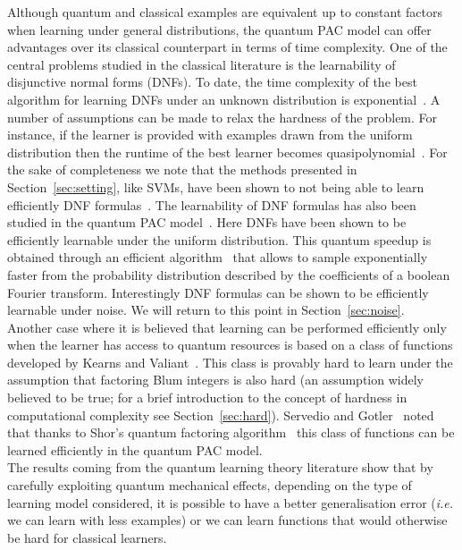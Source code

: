 \documentclass[a4paper, 11pt]{article}
\begin{document}
Although quantum and classical examples are equivalent up to constant factors when learning under general distributions, the quantum PAC model can offer advantages over its classical counterpart in terms of time complexity. One of the central problems studied in the classical literature is the learnability of disjunctive normal forms (DNFs). To date, the time complexity of the best algorithm for learning DNFs under an unknown distribution is exponential~\cite{klivans2001learning}. A number of assumptions can be made to relax the hardness of the problem. For instance, if the learner is provided with examples drawn from the uniform distribution then the runtime of the best learner becomes quasipolynomial~\cite{verbeurgt1990learning}. For the sake of completeness we note that the methods presented in Section~\ref{sec:setting}, like SVMs, have been shown to not being able to learn efficiently DNF formulas~\cite{ben2002limitations, khardon2005maximum}. The learnability of DNF formulas has also been studied in the quantum PAC model~\cite{bshouty1998learning}. Here DNFs have been shown to be efficiently learnable under the uniform distribution. This quantum speedup is obtained through an efficient algorithm~\cite{bernstein1997quantum} that allows to sample exponentially faster from the probability distribution described by the coefficients of a boolean Fourier transform. Interestingly DNF formulas can be shown to be efficiently learnable under noise. We will return to this point in Section~\ref{sec:noise}.\\

Another case where it is believed that learning can be performed efficiently only when the learner has access to quantum resources is based on a class of functions developed by Kearns and Valiant~\cite{kearns1994cryptographic}. This class is provably hard to learn under the assumption that factoring Blum integers is also hard (an assumption widely believed to be true; for a brief introduction to the concept of hardness in computational complexity see Section~\ref{sec:hard}). Servedio and Gotler~\cite{servedio2004equivalences}  noted that thanks to Shor's  quantum factoring algorithm~\cite{shor1997polynomial} this class of functions can be learned efficiently in the quantum PAC model.\\

The results coming from the quantum learning theory literature show that by carefully exploiting quantum mechanical effects, depending on the type of learning model considered, it is possible to have a better generalisation error (\textit{i.e.} we can learn with less examples) or we can learn functions that would otherwise be hard for classical learners.
\end{document}
